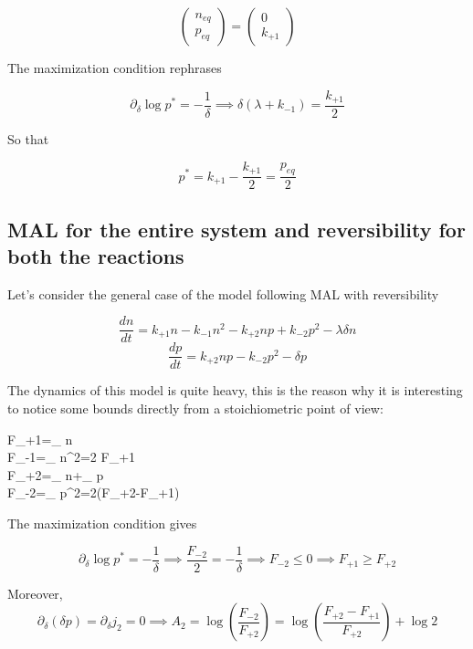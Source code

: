 \documentclass{article}
\begin{document}
	$$ \begin{pmatrix}
		n_{eq} \\ p_{eq}
	\end{pmatrix}=\begin{pmatrix}
		0 \\ k_{+1}
	\end{pmatrix} $$
	
	The maximization condition rephrases
	
	$$ \partial_{\delta} \log p^*=-\frac{1}{\delta} \implies \delta(\lambda+ k_{-1})=\frac{k_{+1}}{2} $$
	
	So that
	
	$$p^*=k_{+1}-\frac{k_{+1}}{2}=\frac{p_{eq}}{2}$$
	
	
	\subsection{MAL for the entire system and reversibility for both the reactions} \label{MALREV}
	Let's consider the general case of the model following MAL with reversibility
	
	\begin{equation}
		\frac{dn}{dt}=k_{+1}n-k_{-1}n^2-k_{+2}n p+k_{-2}p^2-\lambda \delta n
	\end{equation}
	\begin{equation}
		\frac{dp}{dt}=k_{+2}n p-k_{-2}p^2-\delta p
	\end{equation}
	
	The dynamics of this model is quite heavy, this is the reason why it is interesting to notice some bounds directly from a stoichiometric point of view:
	
	\begin{center}
		\begin{cases}
			F_{+1}=\partial_{\delta} \log n \\
			F_{-1}=\partial_{\delta} \log n^2=2 F_{+1}\\
			F_{+2}=\partial_{\delta} \log n+\partial_{\delta} \log p\\
			F_{-2}=\partial_{\delta} \log p^2=2(F_{+2}-F_{+1})\\
		\end{cases}
	\end{center}
	The maximization condition gives
	
	$$\partial_{\delta} \log p^*=-\frac{1}{\delta} \implies \frac{F_{-2}}{2}=-\frac{1}{\delta}\implies F_{-2} \le 0 \implies F_{+1} \ge F_{+2}$$
	
	Moreover, $$\partial_{\delta}(\delta p)=\partial_{\delta} j_2=0 \implies A_2= \log \left( \frac{F_{-2}}{F_{+2}}\right)=\log \left( \frac{F_{+2}-F_{+1}}{F_{+2}}\right)+\log2$$
	
\end{document}
